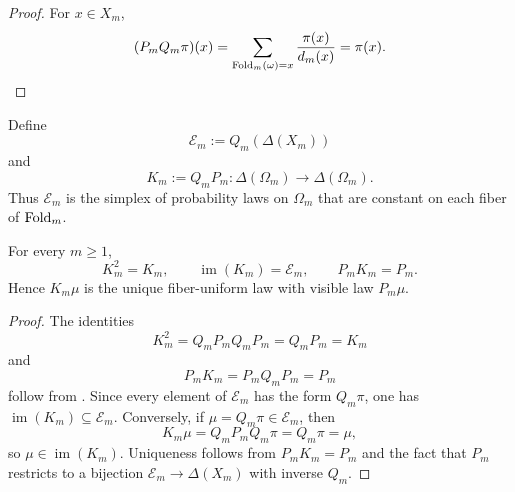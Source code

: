\begin{proof}
For \(x\in X_m\),
\[
  (P_mQ_m\pi)(x)
  =
  \sum_{\mathrm{Fold}_m(\omega)=x}\frac{\pi(x)}{d_m(x)}
  =
  \pi(x).
\]
\end{proof}

\begin{definition}
\label{def:reflector}
Define
\[
  \mathcal E_m:=Q_m(\Delta(X_m))
\]
and
\[
  K_m:=Q_mP_m\colon \Delta(\Omega_m)\to\Delta(\Omega_m).
\]
Thus \(\mathcal E_m\) is the simplex of probability laws on \(\Omega_m\) that
are constant on each fiber of \(\mathrm{Fold}_m\).
\end{definition}

\begin{proposition}
\label{prop:reflector}
For every \(m\ge 1\),
\[
  K_m^2=K_m,
  \qquad
  \operatorname{im}(K_m)=\mathcal E_m,
  \qquad
  P_mK_m=P_m.
\]
Hence \(K_m\mu\) is the unique fiber-uniform law with visible law \(P_m\mu\).
\end{proposition}

\begin{proof}
The identities
\[
  K_m^2
  =
  Q_mP_mQ_mP_m
  =
  Q_mP_m
  =
  K_m
\]
and
\[
  P_mK_m
  =
  P_mQ_mP_m
  =
  P_m
\]
follow from .  Since every element of \(\mathcal E_m\) has
the form \(Q_m\pi\), one has \(\operatorname{im}(K_m)\subseteq \mathcal E_m\).
Conversely, if \(\mu=Q_m\pi\in\mathcal E_m\), then
\[
  K_m\mu
  =
  Q_mP_mQ_m\pi
  =
  Q_m\pi
  =
  \mu,
\]
so \(\mu\in\operatorname{im}(K_m)\).  Uniqueness follows from \(P_mK_m=P_m\)
and the fact that \(P_m\) restricts to a bijection \(\mathcal E_m\to\Delta(X_m)\)
with inverse \(Q_m\).
\end{proof}

